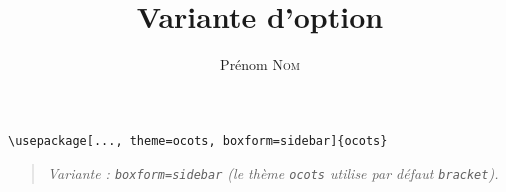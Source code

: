 \documentclass[11pt]{ocots-book}
\title{Variante d'option}
\author{Prénom \textsc{Nom}}
\newcommand{\ocotsvariantnote}[1]{\begin{quote}\itshape Variante : #1\end{quote}}
\begin{document}
\maketitle

\begin{lstlisting}
\usepackage[..., theme=ocots, boxform=sidebar]{ocots}
\end{lstlisting}
\ocotsvariantnote{\texttt{boxform=sidebar} (le th\`eme \texttt{ocots} utilise par d\'efaut \texttt{bracket}).}

\end{document}

